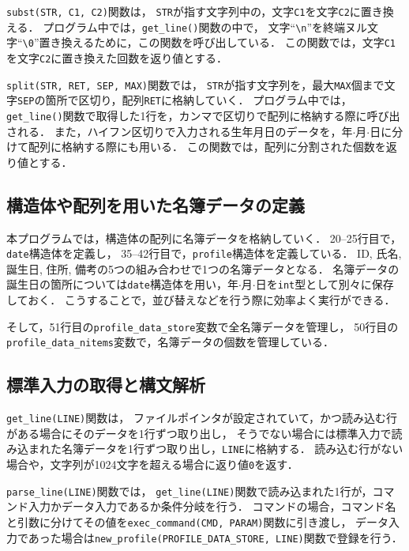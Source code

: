 \documentclass[autodetect-engine,dvi=dvipdfmx,ja=standard,
               a4j,11pt]{bxjsarticle}
\begin{document}
\verb|subst(STR, C1, C2)|関数は，
\verb|STR|が指す文字列中の，文字\verb|C1|を文字\verb|C2|に置き換える．
プログラム中では，\verb|get_line()|関数の中で，
文字``\verb|\n|''を終端ヌル文字``\verb|\0|''置き換えるために，この関数を呼び出している．
この関数では，文字\verb|C1|を文字\verb|C2|に置き換えた回数を返り値とする．

\verb|split(STR, RET, SEP, MAX)|関数では，
\verb|STR|が指す文字列を，最大\verb|MAX|個まで文字\verb|SEP|の箇所で区切り，配列\verb|RET|に格納していく．
プログラム中では，\verb|get_line()|関数で取得した1行を，カンマで区切りで配列に格納する際に呼び出される．
また，ハイフン区切りで入力される生年月日のデータを，年$\cdot$月$\cdot$日に分けて配列に格納する際にも用いる．
この関数では，配列に分割された個数を返り値とする．

\subsection{構造体や配列を用いた名簿データの定義}

本プログラムでは，構造体の配列に名簿データを格納していく．
20--25行目で，\verb|date|構造体を定義し，
35--42行目で，\verb|profile|構造体を定義している．
ID, 氏名, 誕生日, 住所, 備考の5つの組み合わせで1つの名簿データとなる．
名簿データの誕生日の箇所については\verb|date|構造体を用い，年$\cdot$月$\cdot$日を\verb|int|型として別々に保存しておく．
こうすることで，並び替えなどを行う際に効率よく実行ができる．

そして，51行目の\verb|profile_data_store|変数で全名簿データを管理し，
50行目の\verb|profile_data_nitems|変数で，名簿データの個数を管理している．

\subsection{標準入力の取得と構文解析}

\verb|get_line(LINE)|関数は，
ファイルポインタが設定されていて，かつ読み込む行がある場合にそのデータを1行ずつ取り出し，
そうでない場合には標準入力で読み込まれた名簿データを1行ずつ取り出し，\verb|LINE|に格納する．
読み込む行がない場合や，文字列が1024文字を超える場合に返り値\verb|0|を返す．

\verb|parse_line(LINE)|関数では，
\verb|get_line(LINE)|関数で読み込まれた1行が，コマンド入力かデータ入力であるか条件分岐を行う．
コマンドの場合，コマンド名と引数に分けてその値を\verb|exec_command(CMD, PARAM)|関数に引き渡し，
データ入力であった場合は\verb|new_profile(PROFILE_DATA_STORE, LINE)|関数で登録を行う．
\end{document}
